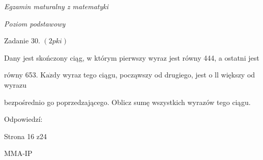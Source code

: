 \documentclass[a4paper,12pt]{article}
\begin{document}
{\it Egzamin maturalny z matematyki}

{\it Poziom podstawowy}

Zadanie 30. $(2pki)$

Dany jest skończony ciąg, w którym pierwszy wyraz jest równy 444, a ostatni jest

równy 653. $\mathrm{K}\mathrm{a}\dot{\mathrm{z}}\mathrm{d}\mathrm{y}$ wyraz tego ciągu, począwszy od drugiego, jest o ll większy od wyrazu

bezpośrednio go poprzedzającego. Oblicz sumę wszystkich wyrazów tego ciągu.

Odpowiedzí:

Strona 16 z24

MMA-IP
\end{document}
